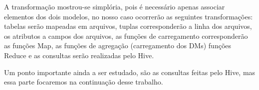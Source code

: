 \documentclass[a4paper,12pt]{article}
\begin{document}
A transformação mostrou-se simplória, pois é necessário apenas associar elementos
dos dois modelos, no nosso caso ocorrerão as seguintes transformações: tabelas serão
mapeadas em arquivos, tuplas corresponderão a linha dos arquivos, os atributos a 
campos dos arquivos, as funções de carregamento corresponderão as funções Map, as 
funções de agregação (carregamento dos DMs) funções Reduce e as consultas serão
realizadas pelo Hive.

Um ponto importante ainda a ser estudado, são as consultas feitas pelo Hive, mas
essa parte focaremos na continuação desse trabalho. 



\end{document}
